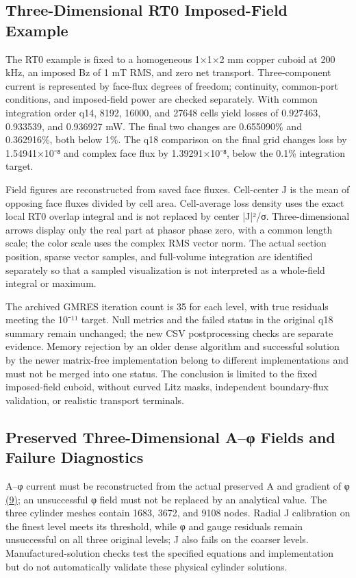 \documentclass[journal,10pt]{IEEEtran}
\begin{document}
\subsection*{Three-Dimensional RT0 Imposed-Field Example}
\hypertarget{S2.rt0.heading}{}
The RT0 example is fixed to a homogeneous 1×1×2 mm copper cuboid at 200 kHz, an imposed Bz of 1 mT RMS, and zero net transport. Three-component current is represented by face-flux degrees of freedom; continuity, common-port conditions, and imposed-field power are checked separately. With common integration order q14, 8192, 16000, and 27648 cells yield losses of 0.927463, 0.933539, and 0.936927 mW. The final two changes are 0.655090\% and 0.362916\%, both below 1\%. The q18 comparison on the final grid changes loss by 1.54941×10⁻⁸ and complex face flux by 1.39291×10⁻⁸, below the 0.1\% integration target.


Field figures are reconstructed from saved face fluxes. Cell-center J is the mean of opposing face fluxes divided by cell area. Cell-average loss density uses the exact local RT0 overlap integral and is not replaced by center |J|²/σ. Three-dimensional arrows display only the real part at phasor phase zero, with a common length scale; the color scale uses the complex RMS vector norm. The actual section position, sparse vector samples, and full-volume integration are identified separately so that a sampled visualization is not interpreted as a whole-field integral or maximum.


The archived GMRES iteration count is 35 for each level, with true residuals meeting the 10⁻¹¹ target. Null metrics and the failed status in the original q18 summary remain unchanged; the new CSV postprocessing checks are separate evidence. Memory rejection by an older dense algorithm and successful solution by the newer matrix-free implementation belong to different implementations and must not be merged into one status. The conclusion is limited to the fixed imposed-field cuboid, without curved Litz masks, independent boundary-flux validation, or realistic transport terminals.


\subsection*{Preserved Three-Dimensional A–φ Fields and Failure Diagnostics}
\hypertarget{S2.aphi.heading}{}
A–φ current must be reconstructed from the actual preserved A and gradient of φ \href{paper_en_ieee.pdf#E07}{(9)}; an unsuccessful φ field must not be replaced by an analytical value. The three cylinder meshes contain 1683, 3672, and 9108 nodes. Radial J calibration on the finest level meets its threshold, while φ and gauge residuals remain unsuccessful on all three original levels; J also fails on the coarser levels. Manufactured-solution checks test the specified equations and implementation but do not automatically validate these physical cylinder solutions.
\end{document}
